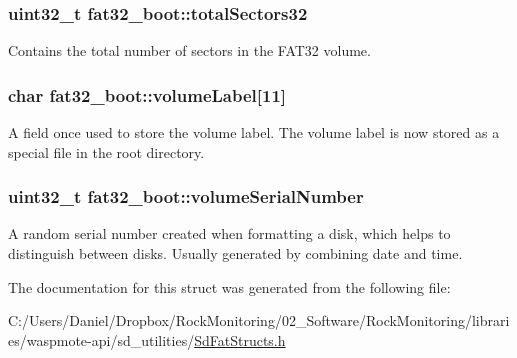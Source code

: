 \subsubsection[{\texorpdfstring{total\+Sectors32}{totalSectors32}}]{\setlength{\rightskip}{0pt plus 5cm}uint32\+\_\+t fat32\+\_\+boot\+::total\+Sectors32}\hypertarget{structfat32__boot_ab79466016103c2762c6b057dd458d434}{}\label{structfat32__boot_ab79466016103c2762c6b057dd458d434}
Contains the total number of sectors in the F\+A\+T32 volume. 
\subsubsection[{\texorpdfstring{volume\+Label}{volumeLabel}}]{\setlength{\rightskip}{0pt plus 5cm}char fat32\+\_\+boot\+::volume\+Label\mbox{[}11\mbox{]}}\hypertarget{structfat32__boot_a8e6349f46344145a7320637a58107b3b}{}\label{structfat32__boot_a8e6349f46344145a7320637a58107b3b}
A field once used to store the volume label. The volume label is now stored as a special file in the root directory. 
\subsubsection[{\texorpdfstring{volume\+Serial\+Number}{volumeSerialNumber}}]{\setlength{\rightskip}{0pt plus 5cm}uint32\+\_\+t fat32\+\_\+boot\+::volume\+Serial\+Number}\hypertarget{structfat32__boot_a20768678da224faefd8acf12cabdbfb8}{}\label{structfat32__boot_a20768678da224faefd8acf12cabdbfb8}
A random serial number created when formatting a disk, which helps to distinguish between disks. Usually generated by combining date and time. 

The documentation for this struct was generated from the following file\+:\begin{DoxyCompactItemize}
\item 
C\+:/\+Users/\+Daniel/\+Dropbox/\+Rock\+Monitoring/02\+\_\+\+Software/\+Rock\+Monitoring/libraries/waspmote-\/api/sd\+\_\+utilities/\hyperlink{_sd_fat_structs_8h}{Sd\+Fat\+Structs.\+h}\end{DoxyCompactItemize}
